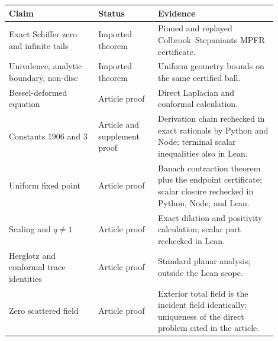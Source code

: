 \documentclass[11pt]{amsart}
\begin{document}
\begin{center}
\small
\begin{tabular}{@{}>{\raggedright\arraybackslash}p{0.30\linewidth}>{\raggedright\arraybackslash}p{0.20\linewidth}>{\raggedright\arraybackslash}p{0.40\linewidth}@{}}
\toprule
Claim & Status & Evidence \\
\midrule
Exact Schiffer zero and infinite tails & Imported theorem & Pinned and
replayed Colbrook--Stepaniants MPFR certificate.\\
Univalence, analytic boundary, non-disc & Imported theorem & Uniform geometry
bounds on the same certified ball.\\
Bessel-deformed equation & Article proof & Direct Laplacian and conformal
calculation.\\
Constants $1906$ and $3$ & Article and supplement proof & Derivation chain
rechecked in exact rationals by Python and Node; terminal scalar
inequalities also in Lean.\\
Uniform fixed point & Article proof & Banach contraction theorem plus the
endpoint certificate; scalar closure rechecked in Python, Node, and
Lean.\\
Scaling and $q\ne1$ & Article proof & Exact dilation and positivity
calculation; scalar part rechecked in Lean.\\
Herglotz and conformal trace identities & Article proof & Standard planar
analysis; outside the Lean scope.\\
Zero scattered field & Article proof & Exterior total field is the incident
field identically; uniqueness of the direct problem cited in the
article.\\
\bottomrule
\end{tabular}
\end{center}


\end{document}
